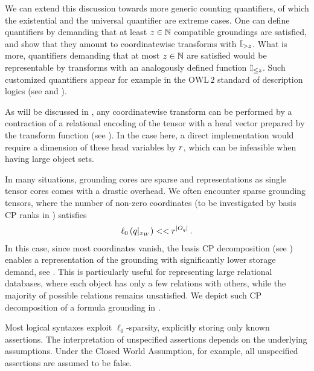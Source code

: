 We can extend this discussion towards more generic counting quantifiers, of which the existential and the universal quantifier are extreme cases.
One can define quantifiers by demanding that at least $z\in\mathbb{N}$ compatible groundings are satisfied, and show that they amount to coordinatewise transforms with $\mathbb{I}_{>z}$.
What is more, quantifiers demanding that at most $z\in\mathbb{N}$ are satisfied would be representable by transforms with an analogously defined function $\mathbb{I}_{\leq z}$.
Such customized quantifiers appear for example in the $\mathrm{OWL\,2}$ standard of description logics (see \cite{rudolph_foundations_2011} and ).

As will be discussed in , any coordinatewise transform can be performed by a contraction of a relational encoding of the tensor with a head vector prepared by the transform function (see ).
In the case here, a direct implementation would require a dimension of these head variables by $r$, which can be infeasible when having large object sets.


\label{sec:basisCPgrounding}

In many situations, grounding cores are sparse and representations as single tensor cores comes with a drastic overhead.
We often encounter sparse grounding tensors, where the number of non-zero coordinates (to be investigated by basis CP ranks in ) satisfies
\begin{align*}
    \ell_0\left({q}|_{x_{W}}\right) << r^{\left|O_{q}\right|} \, .
\end{align*}
In this case, since most coordinates vanish, the basis CP decomposition (see ) enables a representation of the grounding with significantly lower storage demand, see .
This is particularly useful for representing large relational databases, where each object has only a few relations with others, while the majority of possible relations remains unsatisfied.
We depict such CP decomposition of a formula grounding in .

Most logical syntaxes exploit $\ell_0$-sparsity, explicitly storing only known assertions.
The interpretation of unspecified assertions depends on the underlying assumptions.
Under the Closed World Assumption, for example, all unspecified assertions are assumed to be false.

